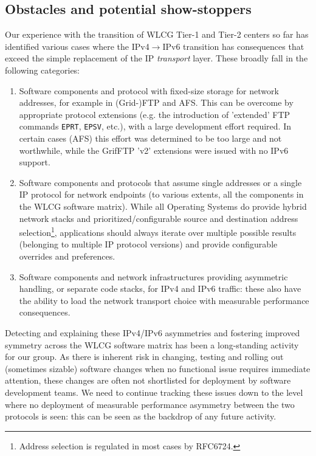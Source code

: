 \subsection{Obstacles and potential show-stoppers}
Our experience with the transition of WLCG Tier-1 and Tier-2 centers so far 
has identified various cases where the IPv4$\rightarrow$IPv6 transition has
consequences that exceed the simple replacement of the IP {\it transport} layer.
These broadly fall in the following categories:
\begin{enumerate}
\item Software components and protocol with fixed-size storage for network
addresses, for example in (Grid-)FTP and AFS. This can be overcome by appropriate
protocol extensions (e.g. the introduction of 'extended' FTP commands
{\tt EPRT}, {\tt EPSV}, etc.), with a large development effort required.
In certain cases (AFS) this effort was determined to be too large and not
worthwhile, while the GrifFTP 'v2' extensions were issued with no IPv6 support.
\item Software components and protocols that assume single addresses or a single
IP protocol for 
network endpoints (to various extents, all the components in the WLCG software
matrix). While all Operating Systems do provide hybrid network stacks and prioritized/configurable
source and destination address selection\footnote{Address selection is regulated in most cases by RFC6724.}, applications should always iterate over multiple
possible results (belonging to multiple IP protocol versions) and provide configurable
overrides and preferences. 
\item Software components and network infrastructures providing asymmetric
handling, or separate code stacks, for IPv4 and IPv6 traffic: these also
have the ability to load the network transport choice with measurable
performance consequences.
\end{enumerate}
Detecting and explaining these IPv4/IPv6 asymmetries and fostering improved
symmetry across the WLCG software matrix has been a long-standing activity
for our group. As there is inherent risk in changing, testing and rolling
out (sometimes sizable) software changes when no functional
issue requires immediate attention, these changes are often not shortlisted
for deployment by software development teams. We need to continue tracking
these issues down to the
level where no deployment of measurable performance asymmetry between the two
protocols is seen: this can be seen as the backdrop of any future activity.

